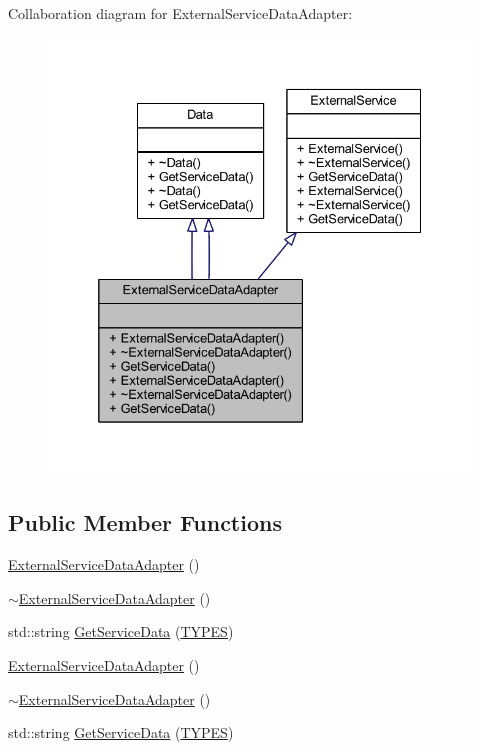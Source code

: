 Collaboration diagram for External\+Service\+Data\+Adapter\+:\nopagebreak
\begin{figure}[H]
\begin{center}
\leavevmode
\includegraphics[width=332pt]{class_external_service_data_adapter__coll__graph}
\end{center}
\end{figure}
\subsection*{Public Member Functions}
\begin{DoxyCompactItemize}
\item 
\mbox{\hyperlink{class_external_service_data_adapter_a65b8464a5fa3a38424ca29215424c749}{External\+Service\+Data\+Adapter}} ()
\item 
\mbox{\hyperlink{class_external_service_data_adapter_a580d0c8f5d86073248afa2a033f1b69c}{$\sim$\+External\+Service\+Data\+Adapter}} ()
\item 
std\+::string \mbox{\hyperlink{class_external_service_data_adapter_aef7b123ab3e636ec263b609dae8bc4e7}{Get\+Service\+Data}} (\mbox{\hyperlink{_class_adapter_2_class_adapter_2_data_8h_aacb79576e5cf053ee9c93cb9d665e32b}{T\+Y\+P\+ES}})
\item 
\mbox{\hyperlink{class_external_service_data_adapter_a65b8464a5fa3a38424ca29215424c749}{External\+Service\+Data\+Adapter}} ()
\item 
\mbox{\hyperlink{class_external_service_data_adapter_a580d0c8f5d86073248afa2a033f1b69c}{$\sim$\+External\+Service\+Data\+Adapter}} ()
\item 
std\+::string \mbox{\hyperlink{class_external_service_data_adapter_aef7b123ab3e636ec263b609dae8bc4e7}{Get\+Service\+Data}} (\mbox{\hyperlink{_class_adapter_2_class_adapter_2_data_8h_aacb79576e5cf053ee9c93cb9d665e32b}{T\+Y\+P\+ES}})
\end{DoxyCompactItemize}


